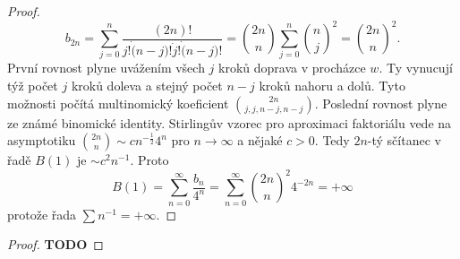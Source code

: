 \documentclass[../main.tex]{subfiles}
\begin{document}
\begin{proof}
    \[
        b_{2n} = \sum_{j=0}^{n}\frac{(2n)!}{j!\dot (n-j)!\dot j! \dot (n-j)!} = \binom{2n}{n} \sum_{j=0}^{n} \binom{n}{j}^2 = \binom{2n}{n}^2.
    \]
    První rovnost plyne uvážením všech $j$ kroků doprava v procházce $w$. Ty vynucují týž počet $j$ kroků doleva a stejný počet $n-j$ kroků nahoru a dolů.
    Tyto možnosti počítá multinomický koeficient $\binom{2n}{j,j,n-j,n-j}$. Poslední rovnost plyne ze známé binomické identity. Stirlingův vzorec pro aproximaci faktoriálu vede na
    asymptotiku $\binom{2n}{n} \sim cn^{-\frac{1}{2}}4^n$ pro $n \to \infty$ a nějaké $c > 0$. Tedy $2n$-tý sčítanec v řadě $B(1)$ je $\sim c^2n^{-1}$. Proto
    \[
        B(1) = \sum_{n=0}^\infty \frac{b_{n}}{4^{n}} = \sum_{n=0}^\infty \binom{2n}{n}^2 4^{-2n} = +\infty
    \]
    protože řada $\sum n^{-1} = +\infty$.
\end{proof}

\begin{proof}
    \LARGE
    \textbf{TODO}
\end{proof}
\end{document}
